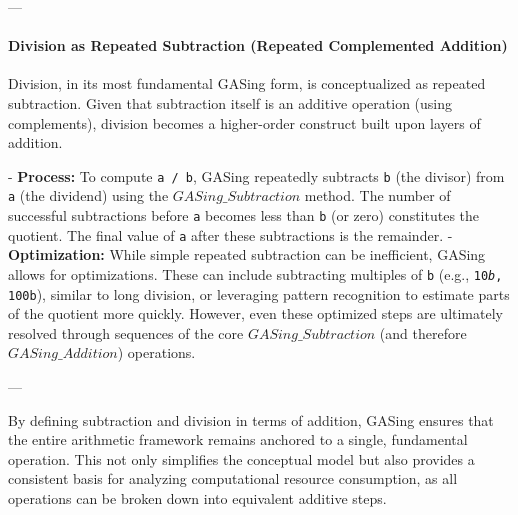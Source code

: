 ---
\paragraph{Division as Repeated Subtraction (Repeated Complemented Addition)}

Division, in its most fundamental GASing form, is conceptualized as repeated subtraction. Given that subtraction itself is an additive operation (using complements), division becomes a higher-order construct built upon layers of addition.

- \textbf{Process:} To compute \texttt{a / b}, GASing repeatedly subtracts \texttt{b} (the divisor) from \texttt{a} (the dividend) using the \texttt{$GASing\_{Subtraction}$} method. The number of successful subtractions before \texttt{a} becomes less than \texttt{b} (or zero) constitutes the quotient. The final value of \texttt{a} after these subtractions is the remainder.
- \textbf{Optimization:} While simple repeated subtraction can be inefficient, GASing allows for optimizations. These can include subtracting multiples of \texttt{b} (e.g., \texttt{10\emph{b}, \texttt{100}b}), similar to long division, or leveraging pattern recognition to estimate parts of the quotient more quickly. However, even these optimized steps are ultimately resolved through sequences of the core \texttt{$GASing\_{Subtraction}$} (and therefore \texttt{$GASing\_{Addition}$}) operations.

---

By defining subtraction and division in terms of addition, GASing ensures that the entire arithmetic framework remains anchored to a single, fundamental operation. This not only simplifies the conceptual model but also provides a consistent basis for analyzing computational resource consumption, as all operations can be broken down into equivalent additive steps.
